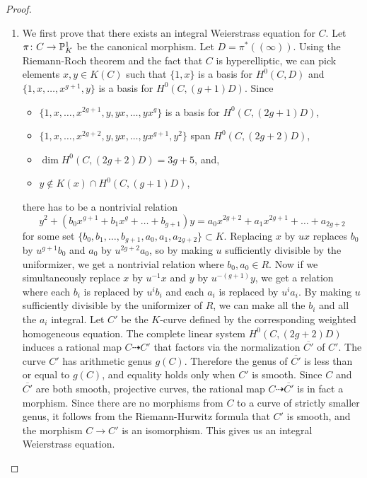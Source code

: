 \begin{proof} \hfill
\begin{enumerate}
\item We first prove that there exists an integral Weierstrass equation for $C$. Let $\pi \colon C \rightarrow \P^1_K$ be the canonical morphism. Let $D = \pi^*((\infty))$. Using the Riemann-Roch theorem and the fact that $C$ is hyperelliptic, we can pick elements $x,y \in K(C)$ such that $\{1,x\}$ is a basis for $H^0(C,D)$ and $\{1,x,\ldots,x^{g+1},y\}$ is a basis for $H^0(C,(g+1)D)$. Since 
 \begin{itemize}
  \item $\{1,x,\ldots,x^{2g+1},y,yx,\ldots,yx^{g}\}$ is a basis for $H^0(C,(2g+1)D)$, 
  \item $\{1,x,\ldots,x^{2g+2},y,yx,\ldots,yx^{g+1},y^2\}$ span $H^0(C,(2g+2)D)$,
  \item $\dim H^0(C,(2g+2)D) = 3g+5$, and,
  \item $y \notin K(x) \cap H^0(C,(g+1)D)$,
 \end{itemize}
there has to be a nontrivial relation 
 \[y^2+(b_0x^{g+1}+b_1x^g+\ldots+b_{g+1})y = a_0x^{2g+2}+a_1x^{2g+1}+\ldots+a_{2g+2} \]
 for some set $\{b_0,b_1,\ldots,b_{g+1},a_0,a_1,a_{2g+2}\} \subset K$. Replacing $x$ by $u x$ replaces $b_0$ by $u^{g+1}b_0$ and $a_0$ by $u^{2g+2}a_0$, so by making $u$ sufficiently divisible by the uniformizer, we get a nontrivial relation where $b_0,a_0 \in R$. Now if we simultaneously replace $x$ by $u^{-1}x$ and $y$ by $u^{-(g+1)}y$, we get a relation where each $b_i$ is replaced by $u^ib_i$ and each $a_i$ is replaced by $u^ia_i$. By making $u$ sufficiently divisible by the uniformizer of $R$, we can make all the $b_i$ and all the $a_i$ integral. Let $C'$ be the $K$-curve defined by the corresponding weighted homogeneous equation. The complete linear system $H^0(C,(2g+2)D)$ induces a rational map $C \dashrightarrow C'$ that factors via the normalization $\overline{C'}$ of $C'$. The curve $C'$ has arithmetic genus $g(C)$. Therefore the genus of $\overline{C'}$ is less than or equal to $g(C)$, and equality holds only when $C'$ is smooth. Since $C$ and $\overline{C'}$ are both smooth, projective curves, the rational map $C \dashrightarrow \overline{C'}$ is in fact a morphism. Since there are no morphisms from $C$ to a curve of strictly smaller genus, it follows from the Riemann-Hurwitz formula that $C'$ is smooth, and the morphism $C \rightarrow C'$ is an isomorphism. This gives us an integral Weierstrass equation. 

\end{enumerate}
\end{proof}
